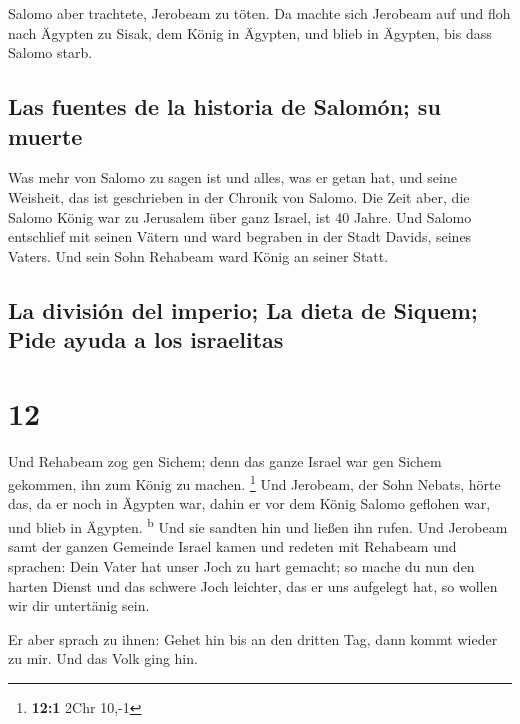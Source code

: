  Salomo aber trachtete, Jerobeam zu töten. Da machte sich
Jerobeam auf und floh nach Ägypten zu Sisak, dem König in Ägypten, und
blieb in Ägypten, bis dass Salomo starb.

\hypertarget{las-fuentes-de-la-historia-de-salomuxf3n-su-muerte}{%
\subsection{Las fuentes de la historia de Salomón; su
muerte}\label{las-fuentes-de-la-historia-de-salomuxf3n-su-muerte}}

 Was mehr von Salomo zu sagen ist und alles, was er getan
hat, und seine Weisheit, das ist geschrieben in der Chronik von Salomo.
 Die Zeit aber, die Salomo König war zu Jerusalem über
ganz Israel, ist 40 Jahre.  Und Salomo entschlief mit
seinen Vätern und ward begraben in der Stadt Davids, seines Vaters. Und
sein Sohn Rehabeam ward König an seiner Statt.

\hypertarget{la-divisiuxf3n-del-imperio-la-dieta-de-siquem-pide-ayuda-a-los-israelitas}{%
\subsection{La división del imperio; La dieta de Siquem; Pide ayuda a
los
israelitas}\label{la-divisiuxf3n-del-imperio-la-dieta-de-siquem-pide-ayuda-a-los-israelitas}}

\hypertarget{section-11}{%
\section{12}\label{section-11}}

 Und Rehabeam zog gen Sichem; denn das ganze Israel war
gen Sichem gekommen, ihn zum König zu machen. \footnote{\textbf{12:1}
  2Chr 10,-1}  Und Jerobeam, der Sohn Nebats, hörte das,
da er noch in Ägypten war, dahin er vor dem König Salomo geflohen war,
und blieb in Ägypten. \textsuperscript{b}  Und sie sandten
hin und ließen ihn rufen. Und Jerobeam samt der ganzen Gemeinde Israel
kamen und redeten mit Rehabeam und sprachen:  Dein Vater
hat unser Joch zu hart gemacht; so mache du nun den harten Dienst und
das schwere Joch leichter, das er uns aufgelegt hat, so wollen wir dir
untertänig sein.

 Er aber sprach zu ihnen: Gehet hin bis an den dritten
Tag, dann kommt wieder zu mir. Und das Volk ging hin.

